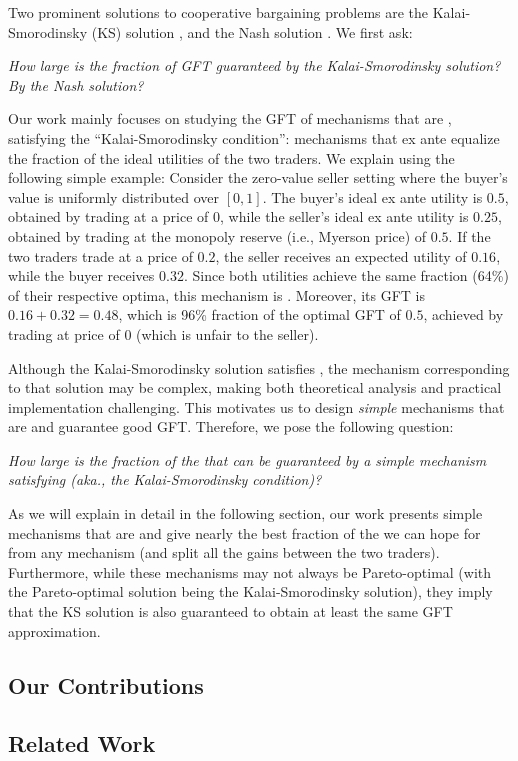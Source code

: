 Two prominent solutions to cooperative bargaining problems are the Kalai-Smorodinsky (KS) solution \citep{KS-75}, and the Nash solution \citep{nash-51}. We first ask:
\begin{displayquote}
\emph{How large is the fraction of GFT guaranteed by the Kalai-Smorodinsky solution? By the Nash solution?} 
\end{displayquote}
Our work mainly focuses on studying the GFT of mechanisms that are \emph{\ksfair}, satisfying the ``Kalai-Smorodinsky condition'': mechanisms that ex ante equalize the fraction of the ideal utilities of the two traders. 
We explain {\ksfairness} using the following simple example: Consider the zero-value seller setting where the buyer's value is uniformly distributed over $[0, 1]$. The buyer's ideal ex ante utility is $0.5$, obtained by trading at a price of $0$, while the seller's ideal ex ante utility is $0.25$, obtained by trading at the monopoly reserve (i.e., Myerson price) of $0.5$. If the two traders trade at a price of $0.2$, the seller receives an expected utility of $0.16$, while the buyer receives $0.32$. Since both utilities achieve the same fraction (64\%) of their respective optima, this mechanism is {\ksfair}. Moreover, its GFT is $0.16+0.32 = 0.48$, which is 96\% fraction of the optimal GFT of $0.5$, achieved by trading at price of $0$ (which is unfair to the seller). 


Although the Kalai-Smorodinsky solution satisfies {\ksfairness}, the mechanism corresponding to that solution may be complex, making both theoretical analysis and practical implementation challenging. This motivates us to design \emph{simple} mechanisms that are {\ksfair} and guarantee good GFT. Therefore, we pose the following question:
\begin{displayquote}
\emph{How large is the fraction of the {\SecondBest} that can be guaranteed by a simple mechanism satisfying {\ksfairness} (aka., the Kalai-Smorodinsky condition)?} 
\end{displayquote}
As we will explain in detail in the following section, our work presents simple mechanisms that are {\ksfair} and give nearly the best fraction of the {\SecondBest} we can hope for {from any {\ksfair} mechanism} (and split all the gains between the two traders). Furthermore, while these mechanisms may not always be Pareto-optimal (with the Pareto-optimal solution being the Kalai-Smorodinsky solution), they imply that the KS solution is also guaranteed to obtain {at least} the same GFT approximation.




\subsection{Our Contributions} 
\label{sec:intro-our}



\subsection{Related Work}
\label{subsec:related work}


